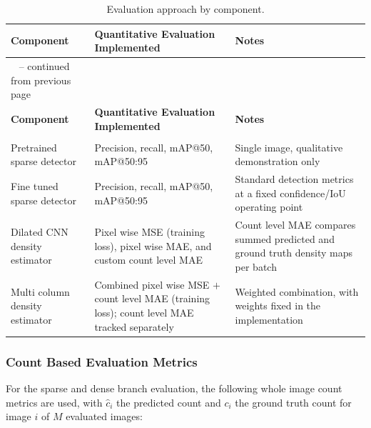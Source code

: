\documentclass[12pt,a4paper]{report}
\begin{document}
\begin{longtable}{|
		>{\raggedright\arraybackslash}p{}|
		>{\raggedright\arraybackslash}p{}|
		>{\raggedright\arraybackslash}p{}|}
	
	\caption{Evaluation approach by component.}
	\label{tab:metrics}\\
	
	\hline
	\textbf{Component} &
	\textbf{Quantitative Evaluation Implemented} &
	\textbf{Notes} \\
	\hline
	\endfirsthead
	
	\multicolumn{3}{c}%
	{{\tablename\ \thetable{} -- continued from previous page}} \\
	\hline
	\textbf{Component} &
	\textbf{Quantitative Evaluation Implemented} &
	\textbf{Notes} \\
	\hline
	\endhead
	
	\hline
	\multicolumn{3}{r}{{Continued on next page}} \\
	\endfoot
	
	\hline
	\endlastfoot
	
	Pretrained sparse detector
	&
	Precision, recall, mAP@50, mAP@50:95
	&
	Single image, qualitative demonstration only
	\\
	\hline
	
	Fine tuned sparse detector
	&
	Precision, recall, mAP@50, mAP@50:95
	&
	Standard detection metrics at a fixed confidence/IoU operating point
	\\
	\hline
		
	Dilated CNN density estimator
	&
	Pixel wise MSE (training loss), pixel wise MAE, and custom count level MAE
	&
	Count level MAE compares summed predicted and ground truth density maps per batch
	\\
	\hline
	
	Multi column density estimator
	&
	Combined pixel wise MSE $+$ count level MAE (training loss); count level MAE tracked separately
	&
	Weighted combination, with weights fixed in the implementation
	\\
	\hline
	
\end{longtable}

\subsubsection{Count Based Evaluation Metrics}

For the sparse and dense branch evaluation, the following whole image count metrics are used, with $\hat c_i$ the predicted count and $c_i$ the ground truth count for image $i$ of $M$ evaluated images:
\end{document}
